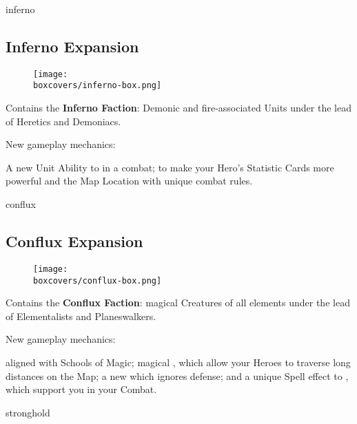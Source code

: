 \begin{multicols}{2}
\begin{expansion}[title=]{inferno}
    \subsection*{\color{inferno}Inferno Expansion}
    \setlength\intextsep{0pt}
    \setlength\columnsep{0.8em}
    \begin{wrapfigure}{l}{0.35\textwidth}
        \texttt{[image: \\boxcovers/inferno-box.png]}
    \end{wrapfigure}
    Contains the \textbf{Inferno Faction}: Demonic and fire-associated Units under the lead of Heretics and Demoniacs.\par
    \medskip
    New gameplay mechanics:\par
    \smallskip
    A new Unit Ability to  in a combat;  to make your Hero's Statistic Cards more powerful and the  Map Location with unique combat rules.
\end{expansion}

\vspace*{1em}
\begin{expansion}[title=]{conflux}
   \subsection*{\color{conflux}Conflux Expansion}
   \setlength\intextsep{0pt}
   \setlength\columnsep{0.8em}
   \begin{wrapfigure}{l}{0.35\textwidth}
       \texttt{[image: \\boxcovers/conflux-box.png]}
   \end{wrapfigure}
   Contains the \textbf{Conflux Faction}: magical Creatures of all elements under the lead of Elementalists and Planeswalkers.\par
   \medskip
   New gameplay mechanics:\par
   \smallskip
    aligned with Schools of Magic; magical , which allow your Heroes to traverse long distances on the Map; a new  which ignores defense; and a unique Spell effect to , which support you in your Combat.
\end{expansion}
\vspace*{\fill}

\columnbreak
\begin{expansion}[title=]{stronghold}

\end{expansion}
\end{multicols}
